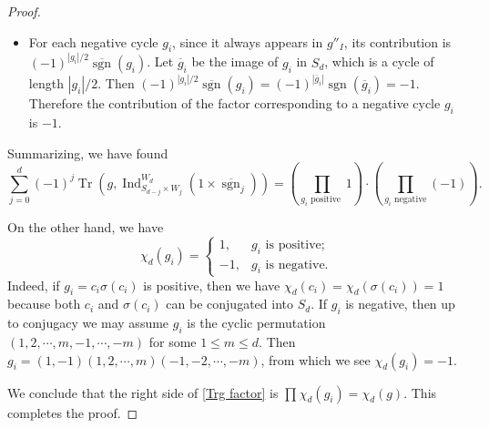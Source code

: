 \documentclass[reqno]{amsart}
\numberwithin{equation}{section}
\newcommand{\sgn}{\operatorname{sgn}}
\newcommand{\ol}[1]{\overline{#1}}
\DeclareMathOperator{\Tr}{Tr}
\DeclareMathOperator{\Ind}{Ind}
\newcommand{\ov}{\overline}
\newcommand{\s}{\sigma}
\theoremstyle{remark}
\numberwithin{equation}{section}
\begin{document}
\begin{proof}
\begin{itemize}
\item For each negative cycle $g_i$, since it always appears in $g''_{I}$, its contribution is  $(-1)^{|g_{i}|/2}\ol{\sgn}(g_i)$. Let  $\ov g_{i}$ be the image of $g_{i}$ in $S_{d}$, which is a cycle of length $|g_{i}|/2$. Then $(-1)^{|g_{i}|/2}\ol{\sgn}(g_i)=(-1)^{|\ov g_{i}|}\sgn(\ov g_{i})=-1$. Therefore the contribution of the factor corresponding to a negative cycle $g_{i}$ is $-1$.
\end{itemize}
Summarizing, we have found 
\begin{equation}\label{Trg factor}
\sum_{j=0}^{d} (-1)^{j}\Tr(g, \Ind_{S_{d-j} \times W_j}^{W_d} (1 \times \ol{\sgn}_j)) = \left( \prod_{g_i \text{ positive }} 1 \right) \cdot  \left( \prod_{g_i \text{ negative} }(-1) \right).
\end{equation}

On the other hand,  we have
\begin{equation}
\chi_{d}(g_{i})=\begin{cases} 1, & g_{i} \mbox{ is positive;} \\ -1, &g_{i} \mbox{ is negative.} \end{cases}
\end{equation}
Indeed, if $g_{i}=c_{i}\s(c_{i})$ is positive, then we have $\chi_{d}(c_{i})=\chi_{d}(\s(c_{i}))=1$ because both $c_{i}$ and $\s(c_{i})$ can be conjugated into $S_{d}$. If $g_{i}$ is negative, then up to conjugacy we may assume $g_{i}$ is the cyclic permutation $(1,2,\cdots, m, -1,\cdots, -m)$ for some $1\le m\le d$. Then $g_{i}=(1,-1)(1,2,\cdots, m) (-1,-2,\cdots, -m)$, from which we see $\chi_{d}(g_{i})=-1$.

We conclude that the right side of \eqref{Trg factor} is $\prod_{}\chi_{d}(g_{i})=\chi_{d}(g)$. This completes the proof.



\end{proof}
\end{document}
